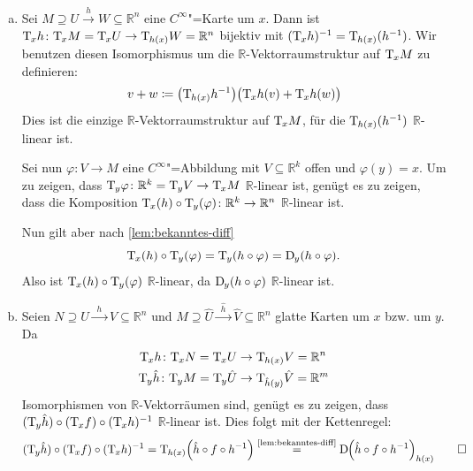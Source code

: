 \begin{beweis}
	\begin{enumerate}[a)]
		\item Sei $M \supseteq U \xrightarrow{h} W \subseteq \mathbb{R}^n $ eine $C^\infty$"=Karte um $x$. 
		Dann ist $\mathrm{T}\mkern-0.85mu_x h \colon \mathrm{T}\mkern-0.85mu_x M = \mathrm{T}\mkern-0.85mu_x U \to \mathrm{T}\mkern-0.85mu_{h(x)} W = \mathbb{R}^n$ bijektiv mit $(\mathrm{T}\mkern-0.85mu_x h)^{-1} = \mathrm{T}\mkern-0.85mu_{h(x)} (h ^{-1})$. 
		Wir benutzen diesen Isomorphismus um die $\mathbb{R}$-Vektorraumstruktur auf $\mathrm{T}\mkern-0.85mu_x M$ zu definieren:
		\[
			v + w \coloneqq \enbrace*{\Tang_{h(x)}  h^{-1}}\enbrace[\big]{\Tang_x h(v) + \Tang_x h(w)}
		\]
		Dies ist die einzige $\mathbb{R}$-Vektorraumstruktur auf $\mathrm{T}\mkern-0.85mu_x M$, für die $\mathrm{T}\mkern-0.85mu_{h(x)}(h ^{-1})$ $\mathbb{R}$-linear ist.
	
		Sei nun $\varphi \colon V \to M$ eine $C^\infty$"=Abbildung mit $V \subseteq \mathbb{R}^k$ offen und $\varphi(y)=x$. 
		Um zu zeigen, dass $\mathrm{T}\mkern-0.85mu_y \varphi \colon \mathbb{R}^k =\mathrm{T}\mkern-0.85mu_y V \to \mathrm{T}\mkern-0.85mu_x M$ $\mathbb{R}$-linear ist, genügt es zu zeigen, dass die Komposition $\mathrm{T}\mkern-0.85mu_x (h) \circ \mathrm{T}\mkern-0.85mu_y (\varphi) \colon \mathbb{R}^k \to \mathbb{R}^n$ $\mathbb{R}$-linear ist.
	
		Nun gilt aber nach \cref{lem:bekanntes-diff}
		\[
			\mathrm{T}\mkern-0.85mu_x (h) \circ  \mathrm{T}\mkern-0.85mu_y (\varphi) = \mathrm{T}\mkern-0.85mu_y (h \circ \varphi) = \mathrm{D}\mkern-1.0mu_y (h \circ \varphi).
		\]
		Also ist $\mathrm{T}\mkern-0.85mu_x (h) \circ \mathrm{T}\mkern-0.85mu_y (\varphi)$ $\mathbb{R}$-linear, da $\mathrm{D}\mkern-1.0mu_y (h \circ \varphi)$ $\mathbb{R}$-linear ist.
		\item Seien $N \supseteq U \xrightarrow{\enspace h \enspace} V \subseteq \mathbb{R}^n $ und $M \supseteq \hat{U} \xrightarrow{\enspace \hat{h} \enspace} \hat{V} \subseteq \mathbb{R}^n$ glatte Karten um $x$ bzw. um $y$. Da 
		\begin{align*}
			\mathrm{T}\mkern-0.85mu_x h \colon \mathrm{T}\mkern-0.85mu_x N  = \mathrm{T}\mkern-0.85mu_x U &\to \mathrm{T}\mkern-0.85mu_{h(x)} V = \mathbb{R}^n \\
			\mathrm{T}\mkern-0.85mu_y \hat{h} \colon \mathrm{T}\mkern-0.85mu_y M = \mathrm{T}\mkern-0.85mu_y \hat{U} &\to \mathrm{T}\mkern-0.85mu_{\hat{h}(y)} \hat{V} = \mathbb{R}^m
		\end{align*}
		Isomorphismen von $\mathbb{R}$-Vektorräumen sind, genügt es zu zeigen, dass $(\mathrm{T}\mkern-0.85mu_y \hat{h}) \circ (\mathrm{T}\mkern-0.85mu_x f) \circ (\mathrm{T}\mkern-0.85mu_x h)^{-1}$ $\mathbb{R}$-linear ist. 
		Dies folgt mit der Kettenregel:
		\[
			(\Tang_y \hat{h}) \circ (\Tang_x f) \circ (\Tang_x h)^{-1} = \Tang_{h(x)} \enbrace*{\hat{h} \circ f \circ h^{-1}} \StackText{\cref{lem:bekanntes-diff}}{=} \D  \enbrace*{\hat{h} \circ  f \circ h^{-1}}_{h(x)} \qedhere
		\]
	\end{enumerate}
\end{beweis}

